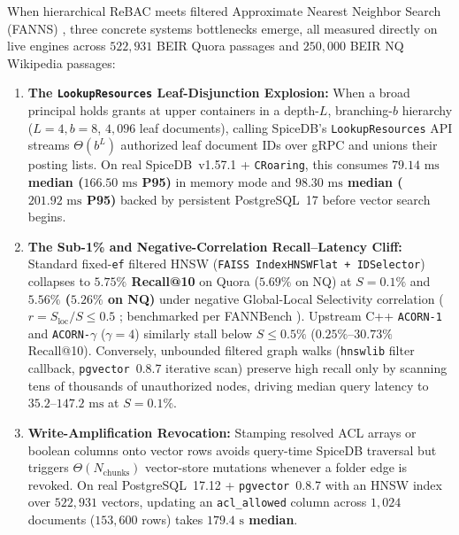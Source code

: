 \documentclass[conference]{IEEEtran}
\begin{document}
When hierarchical ReBAC meets filtered Approximate Nearest Neighbor Search (FANNS) \cite{gollapudi2023filtered,patel2024acorn,cai2024ung,zhong2025honeybee,li2025sieve,iff2025fannbench,yalamarthi2026policy}, three concrete systems bottlenecks emerge, all measured directly on live engines across $522{,}931$ BEIR Quora passages and $250{,}000$ BEIR NQ Wikipedia passages:
\begin{enumerate}
    \item \textbf{The \texttt{LookupResources} Leaf-Disjunction Explosion:} When a broad principal holds grants at upper containers in a depth-$L$, branching-$b$ hierarchy ($L=4, b=8$, $4{,}096$ leaf documents), calling SpiceDB's \texttt{LookupResources} API streams $\Theta(b^L)$ authorized leaf document IDs over gRPC and unions their posting lists. On real SpiceDB~v1.57.1 + \texttt{CRoaring}, this consumes \textbf{$79.14\text{ ms}$ median ($166.50\text{ ms}$ P95)} in memory mode and \textbf{$98.30\text{ ms}$ median ($201.92\text{ ms}$ P95)} backed by persistent PostgreSQL~17 before vector search begins.
    \item \textbf{The Sub-1\% and Negative-Correlation Recall--Latency Cliff:} Standard fixed-\texttt{ef} filtered HNSW (\texttt{FAISS IndexHNSWFlat + IDSelector}) collapses to \textbf{$5.75\%$ Recall@10} on Quora ($5.69\%$ on NQ) at $S=0.1\%$ and \textbf{$5.56\%$ ($5.26\%$ on NQ)} under negative Global-Local Selectivity correlation ($r = S_{\text{loc}}/S \le 0.5$ \cite{amanbayev2026gls}; benchmarked per FANNBench \cite{iff2025fannbench}). Upstream C++ \texttt{ACORN-1} and \texttt{ACORN-$\gamma$} ($\gamma=4$) similarly stall below $S \le 0.5\%$ ($0.25\%$--$30.73\%$ Recall@10). Conversely, unbounded filtered graph walks (\texttt{hnswlib} filter callback, \texttt{pgvector}~0.8.7 iterative scan) preserve high recall only by scanning tens of thousands of unauthorized nodes, driving median query latency to \textbf{$35.2\text{--}147.2\text{ ms}$} at $S=0.1\%$.
    \item \textbf{Write-Amplification Revocation:} Stamping resolved ACL arrays or boolean columns onto vector rows avoids query-time SpiceDB traversal but triggers $\Theta(N_{\text{chunks}})$ vector-store mutations whenever a folder edge is revoked. On real PostgreSQL~17.12 + \texttt{pgvector}~0.8.7 with an HNSW index over $522{,}931$ vectors, updating an \texttt{acl\_allowed} column across $1{,}024$ documents ($153{,}600$ rows) takes \textbf{$179.4\text{ s}$ median}.
\end{enumerate}
\end{document}
